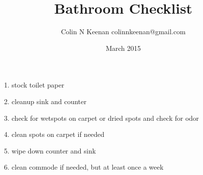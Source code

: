 \documentclass[12pt,letterpaper]{article}
\newcommand{\chorestitle}{Bathroom Checklist}
\begin{document}
\title{\chorestitle{}}
\author{Colin N Keenan colinnkeenan@gmail.com}
\date{March 2015}
\thispagestyle{fancy}
\begin{enumerate}
	\item stock toilet paper
	\item cleanup sink and counter
	\item check for wetspots on carpet or dried spots and check for odor
	\item clean spots on carpet if needed
	\item wipe down counter and sink
	\item clean commode if needed, but at least once a week
\end{enumerate}
\end{document}
